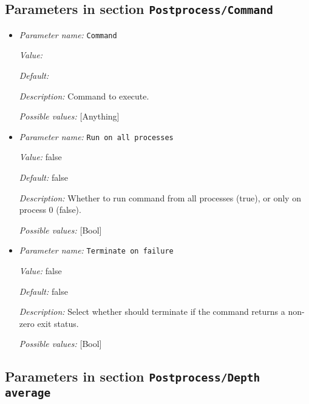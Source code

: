\subsection{Parameters in section \tt Postprocess/Command}
\label{parameters:Postprocess/Command}

\begin{itemize}
\item {\it Parameter name:} {\tt Command}
\label{parameters:Postprocess/Command/Command}


{\it Value:} 


{\it Default:} 


{\it Description:} Command to execute.


{\it Possible values:} [Anything]
\item {\it Parameter name:} {\tt Run on all processes}
\label{parameters:Postprocess/Command/Run on all processes}


{\it Value:} false


{\it Default:} false


{\it Description:} Whether to run command from all processes (true), or only on process 0 (false).


{\it Possible values:} [Bool]
\item {\it Parameter name:} {\tt Terminate on failure}
\label{parameters:Postprocess/Command/Terminate on failure}


{\it Value:} false


{\it Default:} false


{\it Description:} Select whether \aspect{} should terminate if the command returns a non-zero exit status.


{\it Possible values:} [Bool]
\end{itemize}

\subsection{Parameters in section \tt Postprocess/Depth average}
\label{parameters:Postprocess/Depth_20average}

